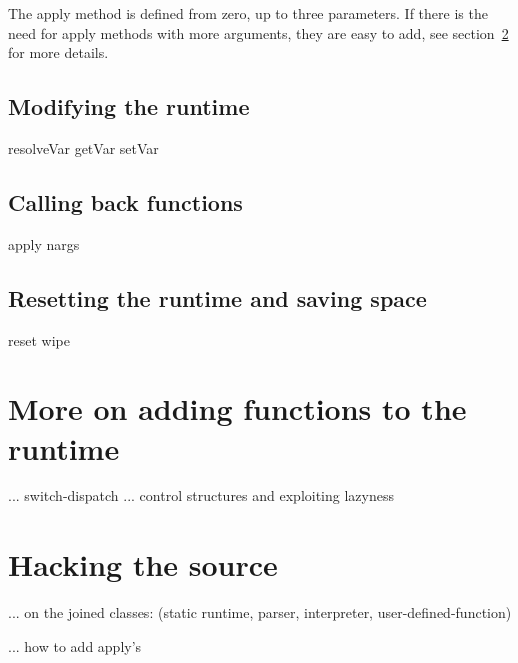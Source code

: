 The apply method is defined from zero, up to three parameters. If there is the need for apply methods with more arguments, they are easy to add, see section~\ref{j2mesource} for more details.

\subsection{Modifying the runtime}
resolveVar getVar setVar
\subsection{Calling back functions}
apply nargs
\subsection{Resetting the runtime and saving space}
reset wipe

\section{More on adding functions to the runtime}
... switch-dispatch
... control structures and exploiting lazyness

\section{Hacking the source}
\label{j2mesource}
... on the joined classes: (static runtime, parser, interpreter, user-defined-function)

... how to add apply's
